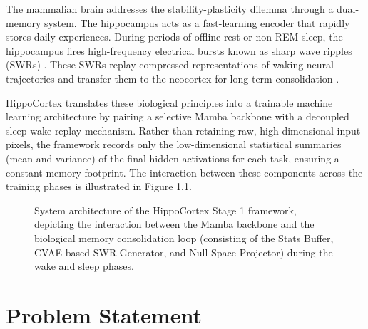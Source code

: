 The mammalian brain addresses the stability-plasticity dilemma through a dual-memory system. The hippocampus acts as a fast-learning encoder that rapidly stores daily experiences. During periods of offline rest or non-REM sleep, the hippocampus fires high-frequency electrical bursts known as sharp wave ripples (SWRs) \cite{buzsakiHippocampalSharpWaveripple2015}. These SWRs replay compressed representations of waking neural trajectories and transfer them to the neocortex for long-term consolidation \cite{buzsakiHippocampalSharpWaveripple2015}. 

HippoCortex translates these biological principles into a trainable machine learning architecture by pairing a selective Mamba backbone with a decoupled sleep-wake replay mechanism. Rather than retaining raw, high-dimensional input pixels, the framework records only the low-dimensional statistical summaries (mean and variance) of the final hidden activations for each task, ensuring a constant memory footprint. The interaction between these components across the training phases is illustrated in Figure 1.1.

\begin{figure}[t]
    \centering
    
    \caption{System architecture of the HippoCortex Stage 1 framework, depicting the interaction between the Mamba backbone and the biological memory consolidation loop (consisting of the Stats Buffer, CVAE-based SWR Generator, and Null-Space Projector) during the wake and sleep phases.}
    \label{fig:research_framework}
\end{figure}

\section{Problem Statement}
\label{sec:problem_statement}

